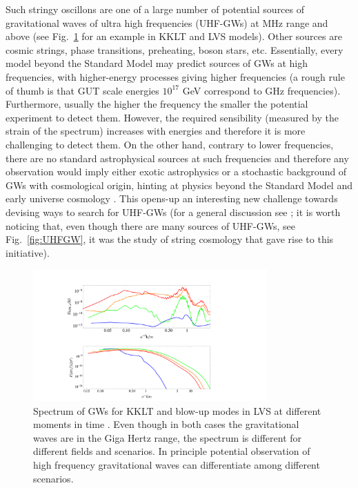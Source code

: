 Such stringy oscillons are one of a large number of potential sources of gravitational waves of ultra high frequencies (UHF-GWs) at MHz range and above (see Fig.~\ref{fig:Oscillons3} for an example in KKLT and LVS models). Other sources are cosmic strings, phase transitions, preheating, boson stars, etc. Essentially, every model beyond the Standard Model may predict sources of GWs at high frequencies, with higher-energy processes giving higher frequencies (a rough rule of thumb is that GUT scale energies $10^{17}$ GeV correspond to GHz frequencies). Furthermore, usually the higher the frequency the smaller the potential experiment to detect them. However, the required sensibility (measured by the strain of the spectrum) increases with energies and therefore it is more challenging to detect them.  On the other hand, contrary to lower frequencies, there are no standard astrophysical sources at such frequencies and 
therefore any observation would imply either exotic astrophysics or a stochastic background of GWs with cosmological origin, hinting at physics beyond the Standard Model and early universe cosmology \cite{Ringwald:2020ist,Muia:2023wru}. This opens-up an interesting new challenge towards devising ways to search for UHF-GWs  (for a general discussion see \cite{Aggarwal:2020olq}; it is worth noticing that, even though there are many sources of UHF-GWs, see Fig.~\ref{fig:UHFGW},  it was the study of string cosmology that gave rise to this initiative).
\begin{figure}[ht]
    \centering
    \includegraphics[width = 0.8\textwidth]{Sections/Figures/OscillonsSpectrum.pdf} 
    \caption{Spectrum of GWs for KKLT and blow-up modes in  LVS at different moments in time \cite{Antusch:2017flz}. Even though  in both cases the gravitational waves are in the Giga Hertz range, the spectrum is different for different fields and scenarios. In principle potential observation of high frequency gravitational waves can differentiate among different scenarios.  }
    \label{fig:Oscillons3}
\end{figure}

